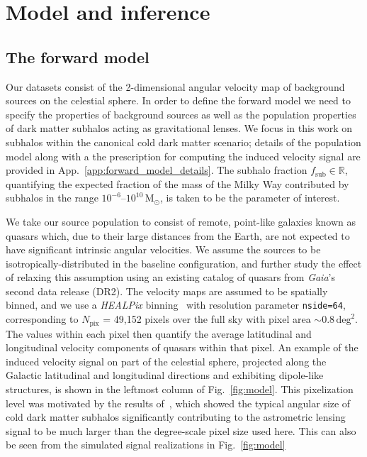 \documentclass[twocolumn,linenumbers,anonymous]{aastex631}
\newcommand{\package}[1]{\textsl{#1}\xspace}
\newcommand{\healpix}{\package{HEALPix}}
\newcommand{\changes}[1]{{{\color{red}#1}}}
\begin{document}
\section{Model and inference}
\label{sec:model}

\subsection{The forward model}
\label{sec:forward_model}

Our datasets consist of the 2-dimensional angular velocity map of background sources on the celestial sphere. \changes{In order to define the forward model we need to specify the properties of background sources as well as the population properties of dark matter subhalos acting as gravitational lenses. We focus in this work on subhalos within the canonical cold dark matter scenario; details of the population model along with a the prescription for computing the induced velocity signal are provided in App.~\ref{app:forward_model_details}.} The subhalo fraction \changes{$f_\mathrm{sub}\in \mathbb R$}, quantifying the expected fraction of the mass of the Milky Way contributed by subhalos in the range $10^{-6}$--$10^{10}\,\mathrm{M}_\odot$, is taken to be the parameter of interest.

We take our source population to consist of remote, point-like galaxies known as quasars which, due to their large distances from the Earth, are not expected to have significant intrinsic angular velocities. We assume the sources to be isotropically-distributed in the baseline configuration, \changes{and further study the effect of relaxing this assumption using an existing catalog of quasars from \emph{Gaia}'s second data release (DR2)}. The velocity maps are assumed to be spatially binned, and we use  a \healpix binning~\citep{Gorski:2004by} with resolution parameter \texttt{nside=64}, corresponding to $N_\mathrm{pix}$ = 49,152 pixels over the full sky with pixel area $\sim 0.8\,\mathrm{deg}^2$. The values within each pixel then quantify the average latitudinal and longitudinal velocity components of quasars within that pixel. An example of the induced velocity signal on part of the celestial sphere, projected along the Galactic latitudinal and longitudinal directions and exhibiting dipole-like structures, is shown in the leftmost column of Fig.~\ref{fig:model}. \changes{This pixelization level was motivated by the results of~\citet{Mishra-Sharma:2020ynk}, which showed the typical angular size of cold dark matter subhalos significantly contributing to the astrometric lensing signal to be much larger than the degree-scale pixel size used here. This can also be seen from the simulated signal realizations in Fig.~\ref{fig:model}}
\end{document}
